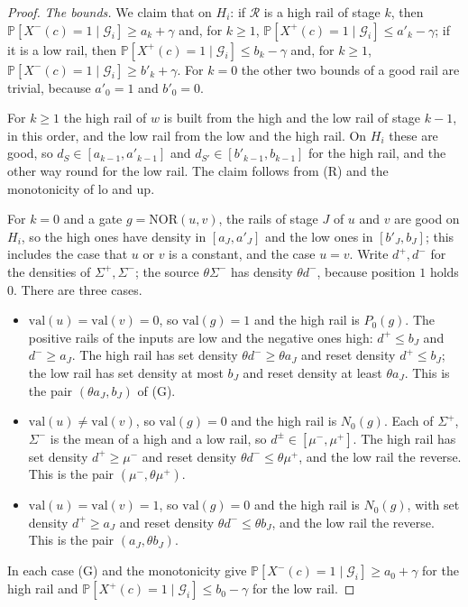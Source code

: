 \documentclass[11pt]{amsart}
\theoremstyle{definition}
\theoremstyle{remark}
\newcommand{\NOR}{\mathrm{NOR}}
\newcommand{\val}{\mathrm{val}}
\newcommand{\PP}{\mathbb{P}}
\begin{document}
\begin{proof}
\emph{The bounds.} We claim that on $H_i$: if $\mathcal R$ is a high rail of stage $k$, then
$\PP[X^-(c)=1\mid\mathcal G_i]\ge a_k+\gamma$ and, for $k\ge1$,
$\PP[X^+(c)=1\mid\mathcal G_i]\le a'_k-\gamma$; if it is a low rail, then
$\PP[X^+(c)=1\mid\mathcal G_i]\le b_k-\gamma$ and, for $k\ge1$,
$\PP[X^-(c)=1\mid\mathcal G_i]\ge b'_k+\gamma$. For $k=0$ the other two bounds of a good rail are
trivial, because $a'_0=1$ and $b'_0=0$.

For $k\ge1$ the high rail of $w$ is built from the high and the low rail of stage $k-1$, in this
order, and the low rail from the low and the high rail. On $H_i$ these are good, so
$d_S\in[a_{k-1},a'_{k-1}]$ and $d_{S'}\in[b'_{k-1},b_{k-1}]$ for the high rail, and the other way
round for the low rail. The claim follows from (R) and the monotonicity of $\mathrm{lo}$ and
$\mathrm{up}$.

For $k=0$ and a gate $g=\NOR(u,v)$, the rails of stage $J$ of $u$ and $v$ are good on $H_i$, so
the high ones have density in $[a_J,a'_J]$ and the low ones in $[b'_J,b_J]$; this includes the
case that $u$ or $v$ is a constant, and the case $u=v$. Write $d^+,d^-$ for the densities of
$\Sigma^+,\Sigma^-$; the source $\theta\Sigma^-$ has density $\theta d^-$, because position $1$
holds $0$. There are three cases.
\begin{itemize}[leftmargin=2em]
\item $\val(u)=\val(v)=0$, so $\val(g)=1$ and the high rail is $P_0(g)$. The positive rails of the
inputs are low and the negative ones high: $d^+\le b_J$ and $d^-\ge a_J$. The high rail has set
density $\theta d^-\ge\theta a_J$ and reset density $d^+\le b_J$; the low rail has set density at
most $b_J$ and reset density at least $\theta a_J$. This is the pair $(\theta a_J,b_J)$ of (G).
\item $\val(u)\ne\val(v)$, so $\val(g)=0$ and the high rail is $N_0(g)$. Each of $\Sigma^+$,
$\Sigma^-$ is the mean of a high and a low rail, so $d^\pm\in[\mu^-,\mu^+]$. The high rail has set
density $d^+\ge\mu^-$ and reset density $\theta d^-\le\theta\mu^+$, and the low rail the reverse.
This is the pair $(\mu^-,\theta\mu^+)$.
\item $\val(u)=\val(v)=1$, so $\val(g)=0$ and the high rail is $N_0(g)$, with set density
$d^+\ge a_J$ and reset density $\theta d^-\le\theta b_J$, and the low rail the reverse. This is the
pair $(a_J,\theta b_J)$.
\end{itemize}
In each case (G) and the monotonicity give $\PP[X^-(c)=1\mid\mathcal G_i]\ge a_0+\gamma$ for the
high rail and $\PP[X^+(c)=1\mid\mathcal G_i]\le b_0-\gamma$ for the low rail.


\end{proof}
\end{document}
